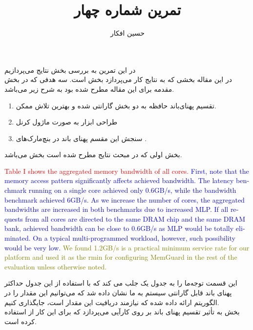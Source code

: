 \documentclass[a4paper, 11pt]{article}
\title{
    تمرین شماره چهار
}
\author{حسین افکار}
\begin{document}
\maketitle

در این تمرین به بررسی بخش نتایج می‌پردازیم \\
در این مقاله بخشی که به نتایج کار می‌پردازد بخش
است.
سه هدفی که در بخش مقدمه برای این مقاله مطرح شده بود به شرح زیر می‌باشد.
\begin{enumerate}
    \item تقسیم پهنای‌باند حافظه به دو بخش گارانتی شده و بهترین تلاش ممکن.
    \item طراحی ابزار به صورت ماژول کرنل
    \item سنجش این مقسم پهنای باند در بنچ‌مارک‌های
    .
\end{enumerate}
بخش اولی که در مبحث نتایج مطرح شده است بخش
می‌باشد.
\begin{latin}
\textcolor{red}{Table I shows the aggregated memory bandwidth of all cores.}
\textcolor{blue}{First, note that the memory
access pattern significantly affects achieved bandwidth. The
latency benchmark running on a single core achieved only
0.6GB/s, while the bandwidth benchmark achieved 6GB/s. As
we increase the number of cores, the aggregated bandwidths
are increased in both benchmarks due to increased MLP. If all
requests from all cores are directed to the same DRAM chip
and the same DRAM bank, achieved bandwidth can be close
to 0.6GB/s as MLP would be totally eliminated. On a typical
multi-programmed workload, however, such possibility would
be very low.}
\textcolor{olive}{We found 1.2GB/s is a practical minimum service
rate for our platform and used it as the rmin for configuring
MemGuard in the rest of the evaluation unless otherwise noted.}
\end{latin}
این قسمت توجه‌ما را به جدول یک جلب می کند که با استفاده از این جدول حداکثر پهنای باند قابل گارانتی سیستم به ما نشان داده شد
که می‌توانیم این مقدار را در الگوریتم ارائه داده شده که نیازمند دریافیت این مقدار است، جایگذاری کنیم. \\
بخش
به تأثیر تقسیم پهنای باند بر روی کارآیی می‌پردازد که برای این‌ کار از
استفاده کرده است.
\end{document}
